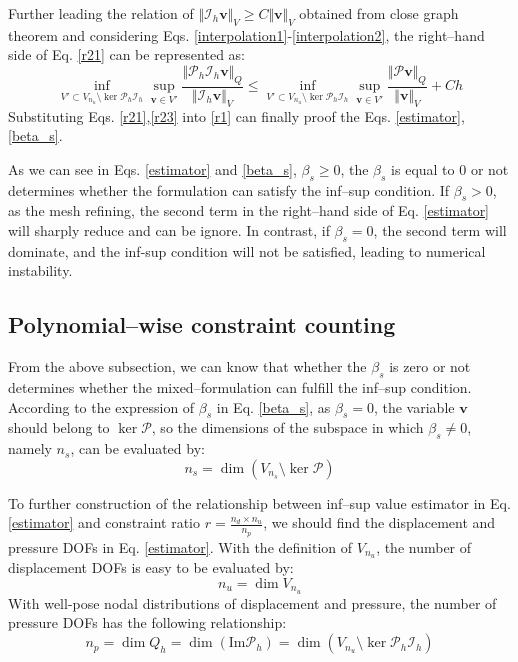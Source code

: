 \begin{pf}
Further leading the relation of $\Vert \mathcal I_h \boldsymbol v\Vert_V \ge C\Vert \boldsymbol v \Vert_V$ obtained from close graph theorem \cite{quarteroni1994} and considering Eqs. \eqref{interpolation1}-\eqref{interpolation2}, the right--hand side of Eq. \eqref{r21} can be represented as:
\begin{equation}\label{r23}
    \inf_{V'\subset V_{n_u}\setminus \ker \mathcal P_h \mathcal I_h} \sup_{\boldsymbol v \in V'} \frac{\Vert \mathcal P_h\mathcal I_h\boldsymbol v\Vert_Q}{\Vert \mathcal I_h \boldsymbol v\Vert_V} 
    \le \inf_{V'\subset V_{n_u}\setminus \ker \mathcal P_h \mathcal I_h} \sup_{\boldsymbol v \in V'} \frac{\Vert \mathcal P \boldsymbol v\Vert_Q}{\Vert \boldsymbol v\Vert_V} + Ch 
\end{equation}
Substituting Eqs. \eqref{r21},\eqref{r23} into \eqref{r1} can finally proof the Eqs. \eqref{estimator}, \eqref{beta_s}.
\end{pf}

As we can see in Eqs. \eqref{estimator} and \eqref{beta_s},
$\beta_s \ge 0$, the $\beta_s$ is equal to $0$ or not determines whether the formulation can satisfy the inf--sup condition.
If $\beta_s > 0$, as the mesh refining, the second term in the right--hand side of Eq. \eqref{estimator} will sharply reduce and can be ignore. In contrast, if $\beta_s = 0$, the second term will dominate, and the inf-sup condition will not be satisfied, leading to numerical instability.

\subsection{Polynomial--wise constraint counting}

From the above subsection, we can know that whether the $\beta_s$ is zero or not determines whether the mixed--formulation can fulfill the inf--sup condition.
According to the expression of $\beta_s$ in Eq. \eqref{beta_s},
as $\beta_s = 0$, the variable $\boldsymbol v$ should belong to $\ker \mathcal P$, so the dimensions of the subspace in which $\beta_s \ne 0$, namely $n_s$, can be evaluated by:
\begin{equation}
    n_s = \dim(V_{n_s}\setminus \ker \mathcal P)
\end{equation}

To further construction of the relationship between inf--sup value estimator in Eq. \eqref{estimator} and constraint ratio $r = \frac{n_d\times n_u}{n_p}$,  
we should find the displacement and pressure DOFs in Eq. \eqref{estimator}.
With the definition of $V_{n_u}$, the number of displacement DOFs is easy to be evaluated by:
\begin{equation}
    n_u = \dim V_{n_u}
\end{equation}
With well-pose nodal distributions of displacement and pressure, the number of pressure DOFs has the following relationship:
\begin{equation}
    n_p = \dim Q_h = \dim (\mathrm{Im} \mathcal P_h)
    = \dim (V_{n_u}\setminus \ker \mathcal P_h \mathcal I_h)
\end{equation}

